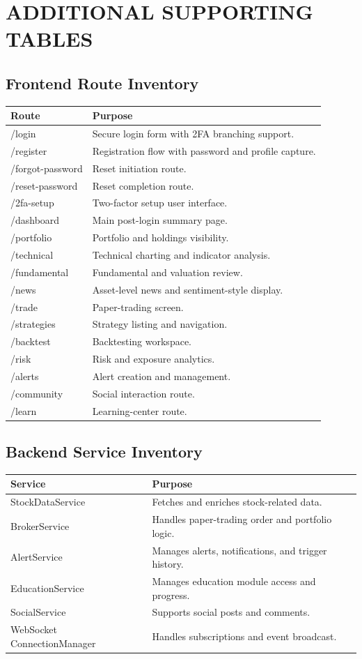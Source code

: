 \documentclass[12pt,a4paper]{report}
\begin{document}
\chapter{ADDITIONAL SUPPORTING TABLES}
\section{Frontend Route Inventory}
\begin{longtable}{p{} p{}}
\textbf{Route} & \textbf{Purpose} \\
\hline
/login & Secure login form with 2FA branching support. \\
/register & Registration flow with password and profile capture. \\
/forgot-password & Reset initiation route. \\
/reset-password & Reset completion route. \\
/2fa-setup & Two-factor setup user interface. \\
/dashboard & Main post-login summary page. \\
/portfolio & Portfolio and holdings visibility. \\
/technical & Technical charting and indicator analysis. \\
/fundamental & Fundamental and valuation review. \\
/news & Asset-level news and sentiment-style display. \\
/trade & Paper-trading screen. \\
/strategies & Strategy listing and navigation. \\
/backtest & Backtesting workspace. \\
/risk & Risk and exposure analytics. \\
/alerts & Alert creation and management. \\
/community & Social interaction route. \\
/learn & Learning-center route. \\
\end{longtable}

\section{Backend Service Inventory}
\begin{longtable}{p{} p{}}
\textbf{Service} & \textbf{Purpose} \\
\hline
StockDataService & Fetches and enriches stock-related data. \\
BrokerService & Handles paper-trading order and portfolio logic. \\
AlertService & Manages alerts, notifications, and trigger history. \\
EducationService & Manages education module access and progress. \\
SocialService & Supports social posts and comments. \\
WebSocket ConnectionManager & Handles subscriptions and event broadcast. \\
\end{longtable}
\end{document}
